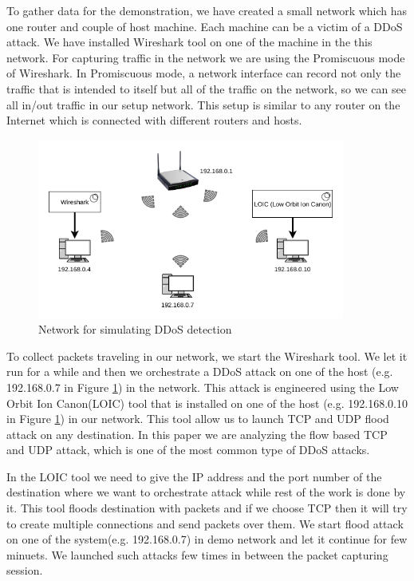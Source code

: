 \documentclass[12pt,oneside,a4paper]{article}
\begin{document}
To gather data for the demonstration, we have created a small network which has one router and couple of host machine. Each machine can be a victim of a DDoS attack. We have installed Wireshark tool on one of the machine in the this network. For capturing traffic in the network we are using the Promiscuous mode of Wireshark. In Promiscuous mode, a network interface can record not only the traffic that is intended to itself but all of the traffic on the network, so we can see all in/out traffic in our setup network. This setup is similar to any router on the Internet which is connected with different routers and hosts.

\begin{figure}[H]
\centering
\includegraphics[width=0.90\textwidth]{demo_network.png}
\caption{Network for simulating DDoS detection} \label{fig:demonetwork}
\end{figure}

To collect packets traveling in our network, we start the Wireshark tool. We let it run for a while and then we orchestrate a DDoS attack on one of the host (e.g. 192.168.0.7 in Figure \ref{fig:demonetwork}) in the network. This attack is engineered using the Low Orbit Ion Canon(LOIC) tool that is installed on one of the host (e.g. 192.168.0.10 in Figure \ref{fig:demonetwork}) in our network. This tool allow us to launch TCP and UDP flood attack on any destination. In this paper we are analyzing the flow based TCP and UDP attack, which is one of the most common type of DDoS attacks.

In the LOIC tool we need to give the IP address and the port number of the destination where we want to orchestrate attack while rest of the work is done by it. This tool floods destination with packets and if we choose TCP then it will try to create multiple connections and send packets over them. We start flood attack on one of the system(e.g. 192.168.0.7) in demo network and let it continue for few minuets. We launched such attacks few times in between the packet capturing session.
\end{document}
